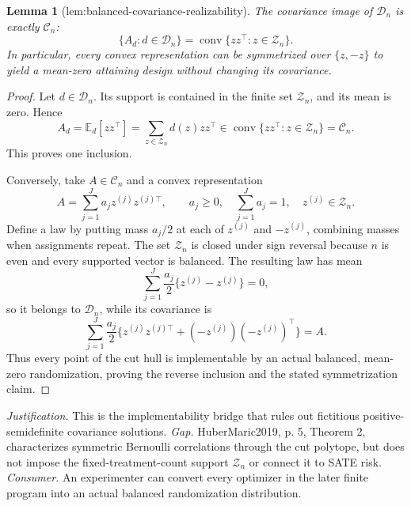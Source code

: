 \documentclass{article}
\newtheorem{lemma}{Lemma}
\begin{document}
\begin{lemma}[lem:balanced-covariance-realizability]\label{lem:balanced-covariance-realizability}
The covariance image of \(\mathcal D_n\) is exactly \(\mathcal C_n\): \[\{A_d:d\in\mathcal D_n\}=\operatorname{conv}\{zz^\top:z\in\mathcal Z_n\}.\] In particular, every convex representation can be symmetrized over \(\{z,-z\}\) to yield a mean-zero attaining design without changing its covariance.
\end{lemma}
\begin{proof}
Let \(d\in\mathcal D_n\).  Its support is contained in the finite set \(\mathcal Z_n\), and its mean is zero.  Hence
\[
A_d=\mathbb E_d[zz^\top]
=\sum_{z\in\mathcal Z_n}d(z)zz^\top
\in\operatorname{conv}\{zz^\top:z\in\mathcal Z_n\}=\mathcal C_n.
\]
This proves one inclusion.

Conversely, take \(A\in\mathcal C_n\) and a convex representation
\[
A=\sum_{j=1}^J a_j z^{(j)}z^{(j)\top},
\qquad a_j\geq0,\quad \sum_{j=1}^J a_j=1,
\quad z^{(j)}\in\mathcal Z_n.
\]
Define a law by putting mass \(a_j/2\) at each of \(z^{(j)}\) and \(-z^{(j)}\), combining masses when assignments repeat.  The set \(\mathcal Z_n\) is closed under sign reversal because \(n\) is even and every supported vector is balanced.  The resulting law has mean
\[
\sum_{j=1}^J\frac{a_j}{2}\{z^{(j)}-z^{(j)}\}=0,
\]
so it belongs to \(\mathcal D_n\), while its covariance is
\[
\sum_{j=1}^J\frac{a_j}{2}
\{z^{(j)}z^{(j)\top}+(-z^{(j)})(-z^{(j)})^\top\}=A.
\]
Thus every point of the cut hull is implementable by an actual balanced, mean-zero randomization, proving the reverse inclusion and the stated symmetrization claim.
\end{proof}
\par\smallskip\noindent \textit{Justification.} This is the implementability bridge that rules out fictitious positive-semidefinite covariance solutions. \textit{Gap.} HuberMaric2019, p. 5, Theorem 2, characterizes symmetric Bernoulli correlations through the cut polytope, but does not impose the fixed-treatment-count support \(\mathcal Z_n\) or connect it to SATE risk. \textit{Consumer.} An experimenter can convert every optimizer in the later finite program into an actual balanced randomization distribution.
\end{document}
